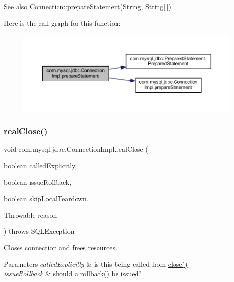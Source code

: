 \begin{DoxySeeAlso}{See also}
Connection\+::prepare\+Statement(\+String, String\mbox{[}$\,$\mbox{]}) 
\end{DoxySeeAlso}
Here is the call graph for this function\+:\nopagebreak
\begin{figure}[H]
\begin{center}
\leavevmode
\includegraphics[width=350pt]{classcom_1_1mysql_1_1jdbc_1_1_connection_impl_a5aeafc10ae08b207b24a7b0e782410e4_cgraph}
\end{center}
\end{figure}
\mbox{\label{classcom_1_1mysql_1_1jdbc_1_1_connection_impl_a644a18de5be3f4793ed1e97834fea266}} 
\subsubsection{\texorpdfstring{real\+Close()}{realClose()}}
{\footnotesize\ttfamily void com.\+mysql.\+jdbc.\+Connection\+Impl.\+real\+Close (\begin{DoxyParamCaption}\item[{boolean}]{called\+Explicitly,  }\item[{boolean}]{issue\+Rollback,  }\item[{boolean}]{skip\+Local\+Teardown,  }\item[{Throwable}]{reason }\end{DoxyParamCaption}) throws S\+Q\+L\+Exception}

Closes connection and frees resources.


\begin{DoxyParams}{Parameters}
{\em called\+Explicitly} & is this being called from \mbox{\hyperlink{classcom_1_1mysql_1_1jdbc_1_1_connection_impl_a9499cd266206c66001685b386c6a6b43}{close()}} \\
\hline
{\em issue\+Rollback} & should a \mbox{\hyperlink{classcom_1_1mysql_1_1jdbc_1_1_connection_impl_a62b6461dc72ef3c739da196995cb9786}{rollback()}} be issued? \\
\hline
\end{DoxyParams}

